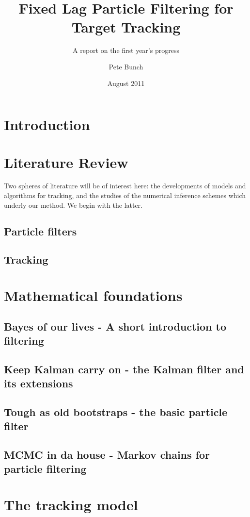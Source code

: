 \documentclass{RJWThesis}
\title{Fixed Lag Particle Filtering for Target Tracking}
\subtitle{A report on the first year's progress}
\author{Pete Bunch}
\date{August 2011}
\begin{document}
\maketitle
\tableofcontents


\chapter{Introduction}


\chapter{Literature Review}
Two spheres of literature will be of interest here: the developments of models and algorithms for tracking, and the studies of the numerical inference schemes which underly our method. We begin with the latter.
\section{Particle filters}

\section{Tracking}


\chapter{Mathematical foundations} \label{chap:basics}
\section{Bayes of our lives - A short introduction to filtering}

\section{Keep Kalman carry on - the Kalman filter and its extensions}

\section{Tough as old bootstraps - the basic particle filter}

\section{MCMC in da house - Markov chains for particle filtering}


\chapter{The tracking model}

\end{document}
